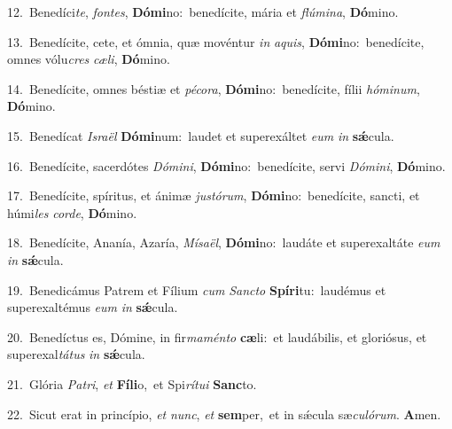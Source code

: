 {\numbfont\textcolor{\numbcolor}{12.}}~Benedíci\-\textit{te}\-, \textit{fon}\-\textit{tes}, \textbf{Dó}\-\textbf{mi}no:~\star benedícite, mária et \textit{flú}\-\textit{mi}\textit{na}, \textbf{Dó}\-mino.\par
{\numbfont\textcolor{\numbcolor}{13.}}~Benedícite, cete, et ómnia, quæ movéntur \textit{in} \textit{a}\-\textit{quis}, \textbf{Dó}\-\textbf{mi}no:~\star benedícite, omnes vólu\textit{cres} \textit{cæ}\-\textit{li}, \textbf{Dó}\-mino.\par
{\numbfont\textcolor{\numbcolor}{14.}}~Benedícite, omnes béstiæ et \textit{pé}\-\textit{co}\textit{ra}, \textbf{Dó}\-\textbf{mi}no:~\star benedícite, fílii \textit{hó}\-\textit{mi}\textit{num}, \textbf{Dó}\-mino.\par
{\numbfont\textcolor{\numbcolor}{15.}}~Benedícat \textit{Is}\-\textit{ra}\textit{ël} \textbf{Dó}\-\textbf{mi}num:~\star laudet et superexáltet \textit{e}\-\textit{um} \textit{in} \textbf{sǽ}\-cula.\par
{\numbfont\textcolor{\numbcolor}{16.}}~Benedícite, sacerdótes \textit{Dó}\-\textit{mi}\textit{ni}, \textbf{Dó}\-\textbf{mi}no:~\star benedícite, servi \textit{Dó}\-\textit{mi}\textit{ni}, \textbf{Dó}\-mino.\par
{\numbfont\textcolor{\numbcolor}{17.}}~Benedícite, spíritus, et ánimæ \textit{jus}\-\textit{tó}\textit{rum}, \textbf{Dó}\-\textbf{mi}no:~\star benedícite, sancti, et húmi\textit{les} \textit{cor}\-\textit{de}, \textbf{Dó}\-mino.\par
{\numbfont\textcolor{\numbcolor}{18.}}~Benedícite, Ananía, Azaría, \textit{Mí}\-\textit{sa}\textit{ël}, \textbf{Dó}\-\textbf{mi}no:~\star laudáte et superexaltáte \textit{e}\-\textit{um} \textit{in} \textbf{sǽ}\-cula.\par
{\numbfont\textcolor{\numbcolor}{19.}}~Benedicámus Patrem et Fílium \textit{cum} \textit{Sanc}\-\textit{to} \textbf{Spí}\-\textbf{ri}tu:~\star laudémus et superexaltémus \textit{e}\-\textit{um} \textit{in} \textbf{sǽ}\-cula.\par
{\numbfont\textcolor{\numbcolor}{20.}}~Benedíctus es, Dómine, in fir\-\textit{ma}\-\textit{mén}\textit{to} \textbf{cæ}\-li:~\star et laudábilis, et gloriósus, et superexal\-\textit{tá}\-\textit{tus} \textit{in} \textbf{sǽ}\-cula.\par
{\numbfont\textcolor{\numbcolor}{21.}}~Glória \textit{Pa}\-\textit{tri}, \textit{et} \textbf{Fí}\-\textbf{li}o,~\star et Spi\-\textit{rí}\-\textit{tu}\textit{i} \textbf{Sanc}\-to.\par
{\numbfont\textcolor{\numbcolor}{22.}}~Sicut erat in princípio, \textit{et} \textit{nunc}\-, \textit{et} \textbf{sem}\-per,~\star et in sǽcula sæ\-\textit{cu}\-\textit{ló}\textit{rum}. \textbf{A}\-men.\par
